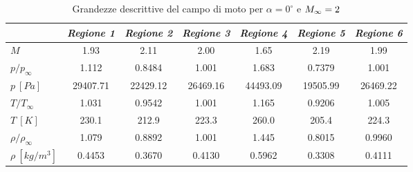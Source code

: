 \begin{table} [H]
	\centering 
	\begin{tabular}{l  c  c c c c c}    
		\toprule 
		 &  \emph{Regione 1} &  \emph{Regione 2} &  \emph{Regione 3} &  \emph{Regione 4} &  \emph{Regione 5} &  \emph{Regione 6}  \\  
		\midrule
		$M$  & 1.93  & 2.11  & 2.00  & 1.65  & 2.19  & 1.99 \\
		$p/p_{\infty}$  & 1.112  & 0.8484  & 1.001  & 1.683  & 0.7379  & 1.001 \\
		$p \ [\si{Pa}]$  & 29407.71  & 22429.12  & 26469.16  & 44493.09  & 19505.99  & 26469.22 \\
		$T/T_{\infty}$  & 1.031 & 0.9542 & 1.001 & 1.165 & 0.9206 & 1.005\\
		$T \ [K]$  & 230.1 & 212.9 & 223.3 & 260.0 & 205.4 & 224.3\\
		$\rho/\rho_{\infty}$  & 1.079 & 0.8892 & 1.001 & 1.445 & 0.8015 & 0.9960\\
		$\rho \ [kg/m^3]$  & 0.4453 & 0.3670 & 0.4130 & 0.5962 & 0.3308 & 0.4111\\
		\bottomrule
	\end{tabular}
\caption {\footnotesize Grandezze descrittive del campo di moto per $\alpha=0^\circ$ e $M_ {\infty}=2$}
\label{tabS10}
\end{table}				






